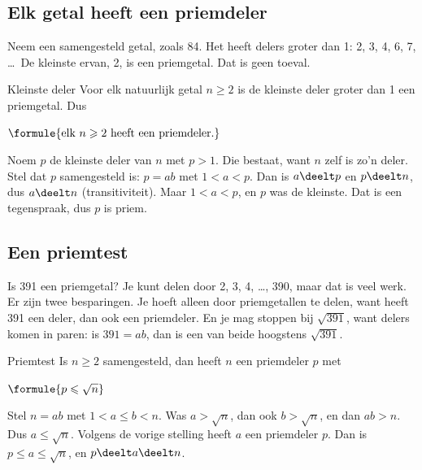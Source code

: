 \subsection{Elk getal heeft een priemdeler}

Neem een samengesteld getal, zoals 84. Het heeft delers groter dan 1: 2, 3, 4, 6, 7, \ldots\ De kleinste ervan, 2, is een priemgetal. Dat is geen toeval.

\begin{theorie}
\begin{stelling}{Kleinste deler}
Voor elk natuurlijk getal $n \geqslant 2$ is de kleinste deler groter dan 1 een priemgetal. Dus

\vspace{1mm}
\qquad $\formule{\text{elk } n \geqslant 2 \text{ heeft een priemdeler.}}$
\end{stelling}

\begin{bewijs}
Noem $p$ de kleinste deler van $n$ met $p > 1$. Die bestaat, want $n$ zelf is zo'n deler. Stel dat $p$ samengesteld is: $p = ab$ met $1 < a < p$. Dan is $a \deelt p$ en $p \deelt n$, dus $a \deelt n$ (transitiviteit). Maar $1 < a < p$, en $p$ was de kleinste. Dat is een tegenspraak, dus $p$ is priem.
\end{bewijs}
\end{theorie}

\subsection{Een priemtest}

Is 391 een priemgetal? Je kunt delen door 2, 3, 4, \ldots, 390, maar dat is veel werk. Er zijn twee besparingen. Je hoeft alleen door priemgetallen te delen, want heeft 391 een deler, dan ook een priemdeler. En je mag stoppen bij $\sqrt{391}$, want delers komen in paren: is $391 = ab$, dan is een van beide hoogstens $\sqrt{391}$.

\begin{theorie}
\begin{stelling}{Priemtest}
Is $n \geqslant 2$ samengesteld, dan heeft $n$ een priemdeler $p$ met

\vspace{1mm}
\qquad $\formule{p \leqslant \sqrt n}$
\end{stelling}

\begin{bewijs}
Stel $n = ab$ met $1 < a \leqslant b < n$. Was $a > \sqrt n$, dan ook $b > \sqrt n$, en dan $ab > n$. Dus $a \leqslant \sqrt n$. Volgens de vorige stelling heeft $a$ een priemdeler $p$. Dan is $p \leqslant a \leqslant \sqrt n$, en $p \deelt a \deelt n$.
\end{bewijs}
\end{theorie}

